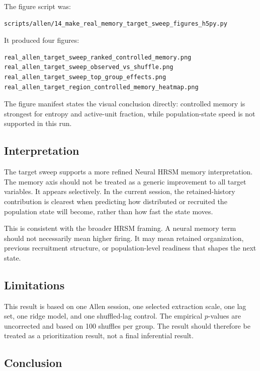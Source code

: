 The figure script was:

\begin{verbatim}
scripts/allen/14_make_real_memory_target_sweep_figures_h5py.py
\end{verbatim}

It produced four figures:

\begin{verbatim}
real_allen_target_sweep_ranked_controlled_memory.png
real_allen_target_sweep_observed_vs_shuffle.png
real_allen_target_sweep_top_group_effects.png
real_allen_target_region_controlled_memory_heatmap.png
\end{verbatim}

The figure manifest states the visual conclusion directly: controlled memory is strongest for entropy and active-unit fraction, while population-state speed is not supported in this run.

\subsection{Interpretation}

The target sweep supports a more refined Neural HRSM memory interpretation. The memory axis should not be treated as a generic improvement to all target variables. It appears selectively. In the current session, the retained-history contribution is clearest when predicting how distributed or recruited the population state will become, rather than how fast the state moves.

This is consistent with the broader HRSM framing. A neural memory term should not necessarily mean higher firing. It may mean retained organization, previous recruitment structure, or population-level readiness that shapes the next state.

\subsection{Limitations}

This result is based on one Allen session, one selected extraction scale, one lag set, one ridge model, and one shuffled-lag control. The empirical \(p\)-values are uncorrected and based on 100 shuffles per group. The result should therefore be treated as a prioritization result, not a final inferential result.

\subsection{Conclusion}

